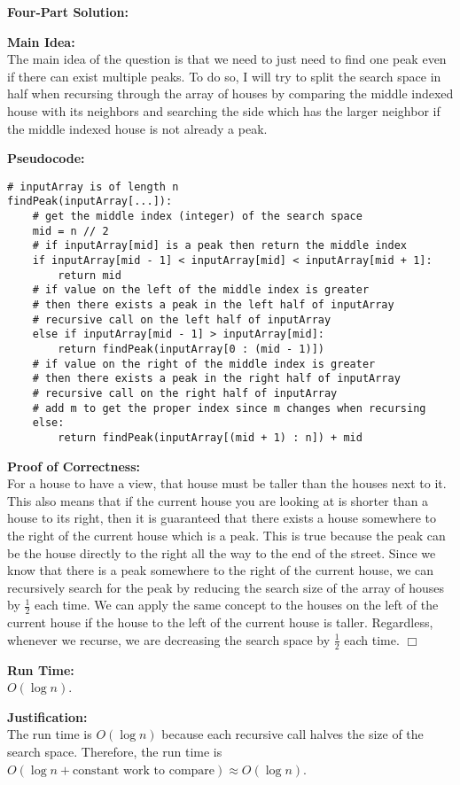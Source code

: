 \documentclass[11pt]{article}
\def\endproofmark{$\Box$}
\newenvironment{FourPartSolution}{\par{\bf Four-Part Solution:}}{\smallskip}
\newenvironment{mainIdea}{\par{\bf Main Idea:}}{\smallskip}
\newenvironment{pseudocode}{\par{\bf Pseudocode:}}{\smallskip}
\newenvironment{proofOfCorrectness}{\par{\bf Proof of Correctness:}}{\endproofmark\smallskip}
\newenvironment{runTime}{\par{\bf Run Time:}}{\smallskip}
\newenvironment{justification}{\par{\bf Justification:}}{\smallskip}
\begin{document}
\begin{FourPartSolution}
\begin{mainIdea}
\\
The main idea of the question is that we need to just need to find one peak even if there can exist multiple peaks. To do so, I will try to split the search space in half when recursing through the array of houses by comparing the middle indexed house with its neighbors and searching the side which has the larger neighbor if the middle indexed house is not already a peak.
\end{mainIdea}
\\
\begin{pseudocode}
\begin{lstlisting}
# inputArray is of length n
findPeak(inputArray[...]):
	# get the middle index (integer) of the search space
	mid = n // 2
	# if inputArray[mid] is a peak then return the middle index
	if inputArray[mid - 1] < inputArray[mid] < inputArray[mid + 1]:
		return mid
	# if value on the left of the middle index is greater
	# then there exists a peak in the left half of inputArray
	# recursive call on the left half of inputArray
	else if inputArray[mid - 1] > inputArray[mid]:
		return findPeak(inputArray[0 : (mid - 1)])
	# if value on the right of the middle index is greater
	# then there exists a peak in the right half of inputArray
	# recursive call on the right half of inputArray
	# add m to get the proper index since m changes when recursing
	else:
		return findPeak(inputArray[(mid + 1) : n]) + mid
\end{lstlisting}
\end{pseudocode}
\begin{proofOfCorrectness}
\\
For a house to have a view, that house must be taller than the houses next to it. This also means that if the current house you are looking at is shorter than a house to its right, then it is guaranteed that there exists a house somewhere to the right of the current house which is a peak. This is true because the peak can be the house directly to the right all the way to the end of the street. Since we know that there is a peak somewhere to the right of the current house, we can recursively search for the peak by reducing the search size of the array of houses by $\frac{1} {2}$ each time. We can apply the same concept to the houses on the left of the current house if the house to the left of the current house is taller. Regardless, whenever we recurse, we are decreasing the search space by $\frac{1} {2}$ each time.
\end{proofOfCorrectness}
\\
\begin{runTime}
\\
$O(\log{n})$.
\end{runTime}
\\
\begin{justification}
\\
The run time is $O(\log{n})$ because each recursive call halves the size of the search space. Therefore, the run time is $O(\log{n} + \text{constant work to compare}) \approx O(\log{n})$.
\end{justification}
\end{FourPartSolution}
\end{document}
